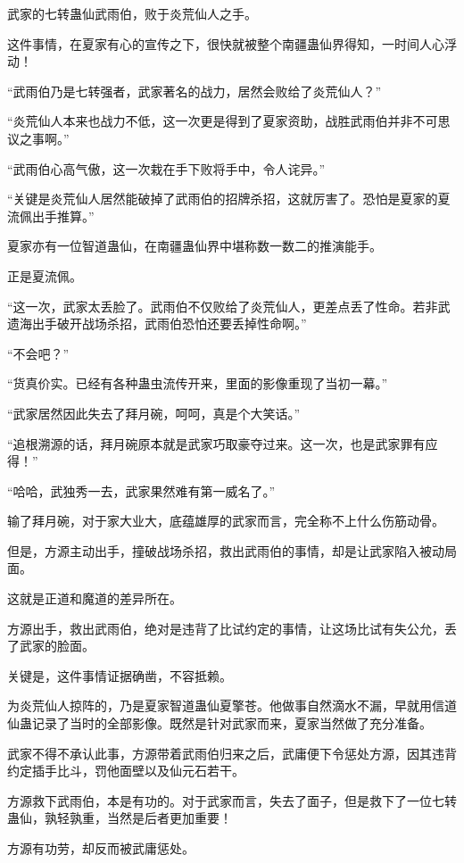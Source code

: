 
\begin{this_body}

武家的七转蛊仙武雨伯，败于炎荒仙人之手。

这件事情，在夏家有心的宣传之下，很快就被整个南疆蛊仙界得知，一时间人心浮动！

“武雨伯乃是七转强者，武家著名的战力，居然会败给了炎荒仙人？”

“炎荒仙人本来也战力不低，这一次更是得到了夏家资助，战胜武雨伯并非不可思议之事啊。”

“武雨伯心高气傲，这一次栽在手下败将手中，令人诧异。”

“关键是炎荒仙人居然能破掉了武雨伯的招牌杀招，这就厉害了。恐怕是夏家的夏流佩出手推算。”

夏家亦有一位智道蛊仙，在南疆蛊仙界中堪称数一数二的推演能手。

正是夏流佩。

“这一次，武家太丢脸了。武雨伯不仅败给了炎荒仙人，更差点丢了性命。若非武遗海出手破开战场杀招，武雨伯恐怕还要丢掉性命啊。”

“不会吧？”

“货真价实。已经有各种蛊虫流传开来，里面的影像重现了当初一幕。”

“武家居然因此失去了拜月碗，呵呵，真是个大笑话。”

“追根溯源的话，拜月碗原本就是武家巧取豪夺过来。这一次，也是武家罪有应得！”

“哈哈，武独秀一去，武家果然难有第一威名了。”

输了拜月碗，对于家大业大，底蕴雄厚的武家而言，完全称不上什么伤筋动骨。

但是，方源主动出手，撞破战场杀招，救出武雨伯的事情，却是让武家陷入被动局面。

这就是正道和魔道的差异所在。

方源出手，救出武雨伯，绝对是违背了比试约定的事情，让这场比试有失公允，丢了武家的脸面。

关键是，这件事情证据确凿，不容抵赖。

为炎荒仙人掠阵的，乃是夏家智道蛊仙夏擎苍。他做事自然滴水不漏，早就用信道仙蛊记录了当时的全部影像。既然是针对武家而来，夏家当然做了充分准备。

武家不得不承认此事，方源带着武雨伯归来之后，武庸便下令惩处方源，因其违背约定插手比斗，罚他面壁以及仙元石若干。

方源救下武雨伯，本是有功的。对于武家而言，失去了面子，但是救下了一位七转蛊仙，孰轻孰重，当然是后者更加重要！

方源有功劳，却反而被武庸惩处。


\end{this_body}
